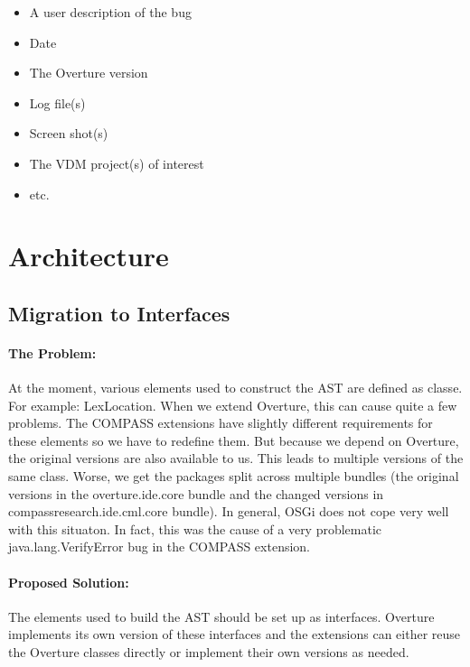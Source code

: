 \documentclass[11pt]{overturerep} \usepackage{t1enc,times,a4,t1enc}
\begin{document}
\begin{itemize}
\item A user description of the bug
\item Date
\item The Overture version
\item Log file(s)
\item Screen shot(s)
\item The VDM project(s) of interest
\item etc.
\end{itemize}






\chapter{Architecture}


\section{Migration to Interfaces} \label{sec:interfacemig}

    \subsubsection{The Problem:}

    At the moment, various elements used to construct the AST are defined as
    classe. For example: \textsf{LexLocation}. When we extend Overture, this
    can cause quite a few problems. The COMPASS extensions have slightly
    different requirements for these elements so we have to redefine them. But
    because we depend on Overture, the original versions are also available to
    us. This leads to multiple versions of the same class. Worse, we get the
    packages split across multiple bundles (the original versions in the
    overture.ide.core bundle and the changed versions in
    compassresearch.ide.cml.core bundle). In general, OSGi does not cope very
    well with this situaton. In fact, this was the cause of a very problematic
    \textsf{java.lang.VerifyError} bug in the COMPASS extension.




    \subsubsection{Proposed Solution:}
    
    The elements used to build the AST should be set up as interfaces. Overture
    implements its own version of these interfaces and the extensions can
    either reuse the Overture classes directly or implement their own versions
    as needed.
\end{document}

